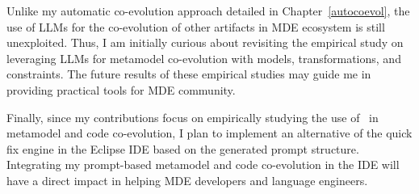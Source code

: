Unlike my automatic co-evolution approach detailed in Chapter~\ref{autocoevol}, the use of LLMs for the co-evolution of other artifacts in MDE ecosystem is still unexploited. Thus, I am initially curious about revisiting the empirical study on leveraging LLMs for metamodel co-evolution with models, transformations, and constraints. The future results of these empirical studies may guide me in providing practical tools for MDE community. 


Finally, since my contributions focus on empirically studying the use of \LLM~in metamodel and code co-evolution, I plan to implement an alternative of the quick fix engine in the Eclipse IDE based on the generated prompt structure. Integrating my prompt-based metamodel and code co-evolution in the IDE will have a direct impact in helping MDE developers and language engineers. 
